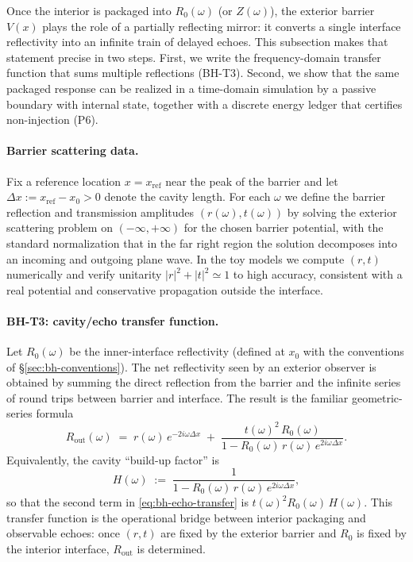 
Once the interior is packaged into $R_0(\omega)$ (or $Z(\omega)$), the exterior barrier $V(x)$ plays the role of a partially reflecting mirror: it converts a single interface reflectivity into an infinite train of delayed echoes. This subsection makes that statement precise in two steps. First, we write the frequency-domain transfer function that sums multiple reflections (BH-T3). Second, we show that the same packaged response can be realized in a time-domain simulation by a passive boundary with internal state, together with a discrete energy ledger that certifies non-injection (P6).

\paragraph{Barrier scattering data.}
Fix a reference location $x=x_{\mathrm{ref}}$ near the peak of the barrier and let $\Delta x := x_{\mathrm{ref}}-x_0>0$ denote the cavity length. For each $\omega$ we define the barrier reflection and transmission amplitudes $(r(\omega),t(\omega))$ by solving the exterior scattering problem on $(-\infty,+\infty)$ for the chosen barrier potential, with the standard normalization that in the far right region the solution decomposes into an incoming and outgoing plane wave. In the toy models we compute $(r,t)$ numerically and verify unitarity $|r|^2+|t|^2\simeq 1$ to high accuracy, consistent with a real potential and conservative propagation outside the interface.

\paragraph{BH-T3: cavity/echo transfer function.}
Let $R_0(\omega)$ be the inner-interface reflectivity (defined at $x_0$ with the conventions of \S\ref{sec:bh-conventions}). The net reflectivity seen by an exterior observer is obtained by summing the direct reflection from the barrier and the infinite series of round trips between barrier and interface. The result is the familiar geometric-series formula
\begin{equation}
  R_{\mathrm{out}}(\omega)
  \;=\;
  r(\omega)\,e^{-2 i\omega\Delta x}
  \; + \;
  \frac{t(\omega)^2\,R_0(\omega)}{1 - R_0(\omega)\,r(\omega)\,e^{2 i\omega\Delta x}}.
  \label{eq:bh-echo-transfer}
\end{equation}
Equivalently, the cavity ``build-up factor'' is
\begin{equation}
  H(\omega) \;:=\; \frac{1}{1 - R_0(\omega)\,r(\omega)\,e^{2 i\omega\Delta x}},
  \label{eq:bh-echo-H}
\end{equation}
so that the second term in \eqref{eq:bh-echo-transfer} is $t(\omega)^2 R_0(\omega)\,H(\omega)$.
This transfer function is the operational bridge between interior packaging and observable echoes: once $(r,t)$ are fixed by the exterior barrier and $R_0$ is fixed by the interior interface, $R_{\mathrm{out}}$ is determined.

